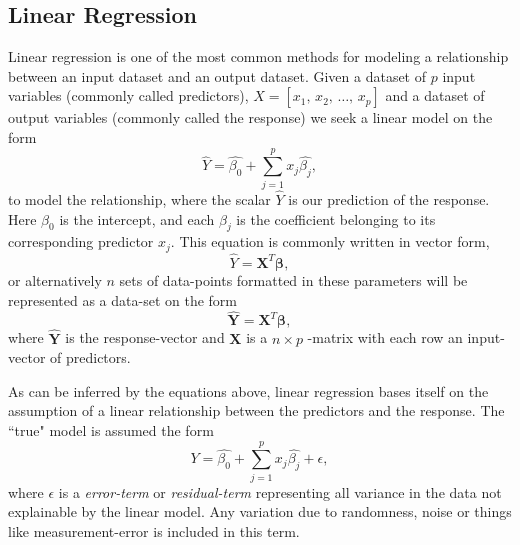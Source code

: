 
\subsection{Linear Regression}

Linear regression is one of the most common methods for modeling a relationship between an input dataset and an output dataset.
Given a dataset of $p$ input variables (commonly called predictors), $X=[x_1, \, x_2, \, \ldots, \, x_p]$ and a dataset of output variables (commonly called the response) we seek a linear model on the form
\begin{equation}
\hat{Y}=\hat{\beta_0}+\sum_{j=1}^{p}x_j\hat{\beta_j},
\end{equation}
to model the relationship, where the scalar $\hat{Y}$ is our prediction of the response. 
Here $\beta_0$ is the intercept, and each $\beta_j$ is the coefficient belonging to its corresponding predictor $x_j$. 
This equation is commonly written in vector form, 
\begin{equation}
\hat{Y}=\boldsymbol{X}^T\boldsymbol{\beta},
\end{equation}
or alternatively $n$ sets of data-points formatted in these parameters will be represented as a data-set on the form
\begin{equation}
\boldsymbol{\hat{Y}}=\boldsymbol{X}^T\boldsymbol{\beta},
\end{equation}
where $\boldsymbol{\hat{Y}}$ is the response-vector and $\boldsymbol{X}$ is a $n\times p$ -matrix with each row an input-vector of predictors.

  

As can be inferred by the equations above, linear regression bases itself on the assumption of a linear relationship between the predictors and the response.
The ``true" model is assumed the form 
\begin{equation}
Y=\hat{\beta_0}+\sum_{j=1}^{p}x_j\hat{\beta_j}+\epsilon,
\end{equation}
where $\epsilon$ is a \textit{error-term} or \textit{residual-term} representing all variance in the data not explainable by the linear model. 
Any variation due to randomness, noise or things like measurement-error is included in this term. 


